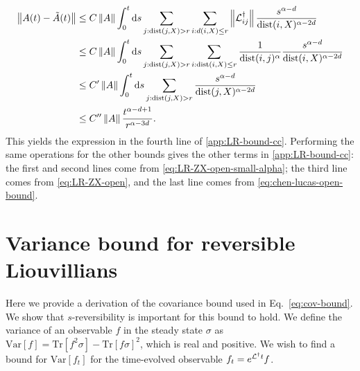 \begin{align}
  \left\|A(t)-\tilde A(t)\right\| & \le C\left\|A\right\|\int_0^t\text{d}s \sum_{j:\text{dist}(j,X)>r} \sum_{i:d(i,X)\le r} \left\|\mathcal{L}^\dagger_{ij}\right\| \frac{s^{\alpha-d}}{\text{dist}(i,X)^{\alpha-2d}} \\
  & \le C\left\|A\right\|\int_0^t\text{d}s \sum_{j:\text{dist}(j,X)>r} \sum_{i:\text{dist}(i,X)\le r} \frac{1}{\text{dist}(i,j)^{\alpha}} \frac{s^{\alpha-d}}{\text{dist}(i,X)^{\alpha-2d}} \\
  &\le C'\left\|A\right\|\int_0^t\text{d}s \sum_{j:\text{dist}(j,X)>r} \frac{s^{\alpha-d}}{\text{dist}(j,X)^{\alpha-2d}} \\
  &\le C''\left\|A\right\|\frac{t^{\alpha-d+1}}{r^{\alpha-3d}}.
\end{align}
This yields the expression in the fourth line of \cref{app:LR-bound-cc}.
Performing the same operations for the other bounds gives the other terms in \cref{app:LR-bound-cc}: the first and second lines come from \cref{eq:LR-ZX-open-small-alpha}; the third line comes from \cref{eq:LR-ZX-open}, and the last line comes from \cref{eq:chen-lucas-open-bound}.


\section{Variance  bound for reversible Liouvillians} \label{sec:var-bound}

Here we provide a derivation of the covariance bound used in Eq.~\eqref{eq:cov-bound}.  We show that $s$-reversibility is important for this bound to hold. We define the variance of an observable $f$  in the steady state $\sigma$ as $\text{Var}[f] = \text{Tr}[f^2 \sigma] - \text{Tr}[f \sigma]^2$, which is real and positive. We wish to find a bound for $\text{Var}[f_t]$ for the time-evolved observable $f_t = e^{\mathcal{L}^\dagger t} f$.



